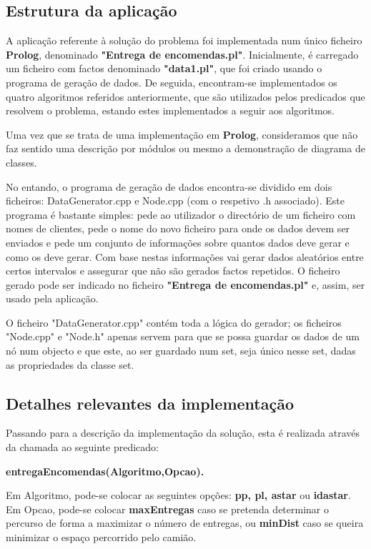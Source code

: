 \documentclass[a4paper]{article}
\begin{document}
\subsection{Estrutura da aplicação} 

A aplicação referente à solução do problema foi implementada num único ficheiro \textbf{Prolog}, denominado \textbf{"Entrega de encomendas.pl"}. Inicialmente, é carregado um ficheiro com factos denominado \textbf{"data1.pl"}, que foi criado usando o programa de geração de dados. De seguida, encontram-se implementados os quatro algoritmos referidos anteriormente, que são utilizados pelos predicados que resolvem o problema, estando estes implementados a seguir aos algoritmos.

Uma vez que se trata de uma implementação em \textbf{Prolog}, consideramos que não faz sentido uma descrição por módulos ou mesmo a demonstração de diagrama de classes.

No entando, o programa de geração de dados encontra-se dividido em dois ficheiros: DataGenerator.cpp e Node.cpp (com o respetivo .h associado).
Este programa é bastante simples: pede ao utilizador o directório de um ficheiro com nomes de clientes, pede o nome do novo ficheiro para onde os dados devem ser enviados e pede um conjunto de informações sobre quantos dados deve gerar e como os deve gerar. Com base nestas informações vai gerar dados aleatórios entre certos intervalos e assegurar que não são gerados factos repetidos.
O ficheiro gerado pode ser indicado no ficheiro \textbf{"Entrega de encomendas.pl"} e, assim, ser usado pela aplicação.

O ficheiro "DataGenerator.cpp" contém toda a lógica do gerador; os ficheiros "Node.cpp" e "Node.h" apenas servem para que se possa guardar os dados de um nó num objecto e que este, ao ser guardado num set, seja único nesse set, dadas as propriedades da classe set.

\subsection{Detalhes relevantes da implementação} 

Passando para a descrição da implementação da solução, esta é realizada através da chamada ao seguinte predicado:

\centerline{\textbf{entregaEncomendas(Algoritmo,Opcao).}}

Em Algoritmo, pode-se colocar as seguintes opções: \textbf{pp, pl, astar} ou \textbf{idastar}. Em Opcao, pode-se colocar \textbf{maxEntregas} caso se pretenda determinar o percurso de forma a maximizar o número de entregas, ou \textbf{minDist} caso se queira minimizar o espaço percorrido pelo camião.
\end{document}
